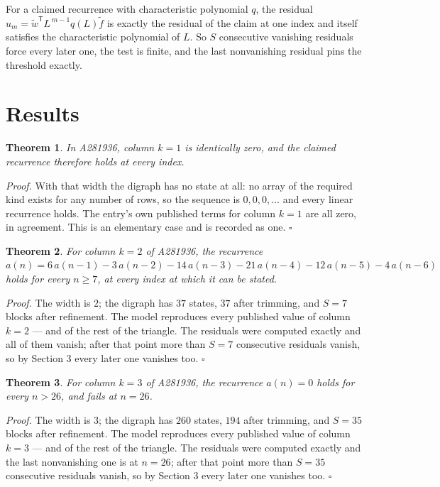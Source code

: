 \documentclass[11pt]{article}
\newtheorem{theorem}{Theorem}
\theoremstyle{definition}
\begin{document}
For a claimed recurrence with characteristic polynomial $q$, the residual $u_m = \tilde w^{\mathsf T}L^{\,m-1}q(L)\tilde f$ is exactly the residual of the claim at one index and itself satisfies the characteristic polynomial of $L$. So $S$ consecutive vanishing residuals force every later one, the test is finite, and the last nonvanishing residual pins the threshold exactly.

\section{Results}

\begin{theorem} In A281936, column $k = 1$ is identically zero, and the claimed recurrence therefore holds at every index.\end{theorem}

{\itshape Proof.} With that width the digraph has no state at all: no array of the required kind exists for any number of rows, so the sequence is $0,0,0,\dots$ and every linear recurrence holds. The entry's own published terms for column $k = 1$ are all zero, in agreement. This is an elementary case and is recorded as one. $\square$

\begin{theorem} For column $k = 2$ of A281936, the recurrence $a(n) = 6\,a(n-1) - 3\,a(n-2) - 14\,a(n-3) - 21\,a(n-4) - 12\,a(n-5) - 4\,a(n-6)$ holds for every $n \ge 7$, at every index at which it can be stated.\end{theorem}

{\itshape Proof.} The width is $2$; the digraph has $37$ states, $37$ after trimming, and $S = 7$ blocks after refinement. The model reproduces every published value of column $k = 2$ --- and of the rest of the triangle. The residuals were computed exactly and all of them vanish; after that point more than $S = 7$ consecutive residuals vanish, so by Section 3 every later one vanishes too. $\square$

\begin{theorem} For column $k = 3$ of A281936, the recurrence $a(n) = 0$ holds for every $n > 26$, and fails at $n = 26$.\end{theorem}

{\itshape Proof.} The width is $3$; the digraph has $260$ states, $194$ after trimming, and $S = 35$ blocks after refinement. The model reproduces every published value of column $k = 3$ --- and of the rest of the triangle. The residuals were computed exactly and the last nonvanishing one is at $n = 26$; after that point more than $S = 35$ consecutive residuals vanish, so by Section 3 every later one vanishes too. $\square$
\end{document}
